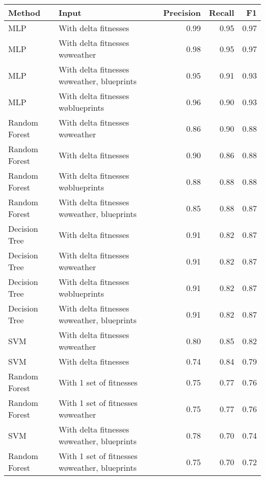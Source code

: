 \begin{tabular}{llrrr}
\toprule
        Method &                                           Input &  Precision &  Recall &   F1 \\
\midrule
           MLP &                            With delta fitnesses &       0.99 &    0.95 & 0.97 \\
           MLP &                With delta fitnesses w\o weather &       0.98 &    0.95 & 0.97 \\
           MLP &    With delta fitnesses w\o weather, blueprints &       0.95 &    0.91 & 0.93 \\
           MLP &             With delta fitnesses w\o blueprints &       0.96 &    0.90 & 0.93 \\
 Random Forest &                With delta fitnesses w\o weather &       0.86 &    0.90 & 0.88 \\
 Random Forest &                            With delta fitnesses &       0.90 &    0.86 & 0.88 \\
 Random Forest &             With delta fitnesses w\o blueprints &       0.88 &    0.88 & 0.88 \\
 Random Forest &    With delta fitnesses w\o weather, blueprints &       0.85 &    0.88 & 0.87 \\
 Decision Tree &                            With delta fitnesses &       0.91 &    0.82 & 0.87 \\
 Decision Tree &                With delta fitnesses w\o weather &       0.91 &    0.82 & 0.87 \\
 Decision Tree &             With delta fitnesses w\o blueprints &       0.91 &    0.82 & 0.87 \\
 Decision Tree &    With delta fitnesses w\o weather, blueprints &       0.91 &    0.82 & 0.87 \\
           SVM &                With delta fitnesses w\o weather &       0.80 &    0.85 & 0.82 \\
           SVM &                            With delta fitnesses &       0.74 &    0.84 & 0.79 \\
 Random Forest &                         With 1 set of fitnesses &       0.75 &    0.77 & 0.76 \\
 Random Forest &             With 1 set of fitnesses w\o weather &       0.75 &    0.77 & 0.76 \\
           SVM &    With delta fitnesses w\o weather, blueprints &       0.78 &    0.70 & 0.74 \\
 Random Forest & With 1 set of fitnesses w\o weather, blueprints &       0.75 &    0.70 & 0.72 \\

\end{tabular}
